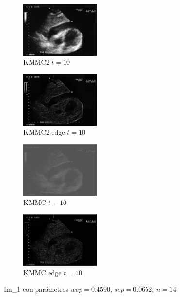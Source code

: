 \documentclass[a4paper,10pt,twocolumn]{article}
\begin{document}
\begin{center}
\begin{figure}[!htb]
		\begin{subfigure}[d!]{4cm}
			\includegraphics[width=4cm]{image/im1/im_1_10}
			\caption{KMMC2 $t = 10$}
		\end{subfigure}
		\begin{subfigure}[i!]{4cm}
			\includegraphics[width=4cm]{image/im1/im_1_10_edge}
			\caption{KMMC2 edge $t = 10$}
		\end{subfigure}
		\begin{subfigure}[j!]{4cm}
			\includegraphics[width=4cm]{image/im1/im_1_10_norm}
			\caption{KMMC $t = 10$}
		\end{subfigure}
		\begin{subfigure}[k!]{4cm}
			\includegraphics[width=4cm]{image/im1/im_1_10_norm_edge}
			\caption{KMMC edge $t = 10$}
		\end{subfigure}
		
		\caption{Im\_1 con par\'ametros $wep = 0.4590$, $sep = 0.0652$, $n = 14$}
	\end{figure}
\end{center}
\end{document}
